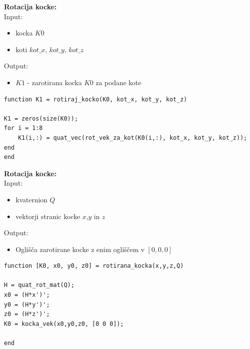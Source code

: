 \documentclass[12pt,a4paper,twoside]{article}
\theoremstyle{definition} %
\theoremstyle{plain} %
\numberwithin{equation}{section}  %
\begin{document}
%
%

\vspace{0.5cm}
\textbf{Rotacija kocke:}\\
Input:
\begin{itemize}
\item kocka $K0$
\item koti $kot\_x$, $kot\_y$, $kot\_z$
\end{itemize}
Output:
\begin{itemize}
\item $K1$ - zarotirana kocka $K0$ za podane kote
\end{itemize}

\begin{lstlisting}[caption = {rotiraj\_kocko}]
function K1 = rotiraj_kocko(K0, kot_x, kot_y, kot_z)

K1 = zeros(size(K0));
for i = 1:8
    K1(i,:) = quat_vec(rot_vek_za_kot(K0(i,:), kot_x, kot_y, kot_z));
end
end
\end{lstlisting}

\vspace{0.5cm}
\textbf{Rotacija kocke:}\\
Input:
\begin{itemize}
\item kvaternion $Q$
\item vektorji stranic kocke $x$,$y$ in $z$
\end{itemize}
Output:
\begin{itemize}
\item Oglišča zarotirane kocke z enim ogliščem v $[0,0,0]$
\end{itemize}

\begin{lstlisting}[caption = {rotirana\_kocka}]
function [K0, x0, y0, z0] = rotirana_kocka(x,y,z,Q)

H = quat_rot_mat(Q);
x0 = (H*x')';
y0 = (H*y')'; 
z0 = (H*z')';
K0 = kocka_vek(x0,y0,z0, [0 0 0]);

end
\end{lstlisting}
\end{document}
